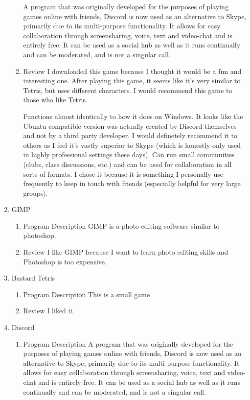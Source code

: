 \documentclass{article}
\begin{document}
\begin{enumerate}
\begin{enumerate}
A program that was originally developed for the purposes of playing games online with friends, Discord is now used as an alternative to Skype, primarily due to its multi-purpose functionality. It allows for easy collaboration through screensharing, voice, text and video-chat and is entirely free. It can be used as a social hub as well as it runs continually and can be moderated, and is not a singular call.
\item Review
\label{sec:org99d6262}
I downloaded this game because I thought it would be a fun and interesting one. After playing this game, it seems like it's very similar to Tetris, but uses different characters. I would recommend this game to those who like Tetris.  

Functions almost identically to how it does on Windows. It looks like the Ubuntu compatible version was actually created by Discord themselves and not by a third party developer. I would definetely recommend it to others as I feel it's vastly superior to Skype (which is honestly only used in highly professional settings these days). Can run small communities (clubs, class discussions, etc.) and can be used for collaboration in all sorts of formats. I chose it because it is something I personally use frequently to keep in touch with friends (especially helpful for very large groups).
\end{enumerate}
\item GIMP
\label{sec:orgc9ac7d0}
\begin{enumerate}
\item Program Description
\label{sec:org390d658}
GIMP is a photo editing software similar to photoshop.
\item Review
\label{sec:org77e9efc}
I like GIMP because I want to learn photo editing skills and Photoshop is too expensive.
\end{enumerate}
\item Bastard Tetris
\label{sec:org0c58327}
\begin{enumerate}
\item Program Description
\label{sec:orgaa478ce}
This is a small game
\item Review
\label{sec:org0d939b5}
I liked it
\end{enumerate}
\item Discord
\label{sec:org5bc5673}
\begin{enumerate}
\item Program Description
\label{sec:org0d017dd}
A program that was originally developed for the purposes of playing games online with friends, Discord is now used as an alternative to Skype, primarily due to its multi-purpose functionality. It allows for easy collaboration through screensharing, voice, text and video-chat and is entirely free. It can be used as a social hub as well as it runs continually and can be moderated, and is not a singular call.

\end{enumerate}
\end{enumerate}
\end{document}
